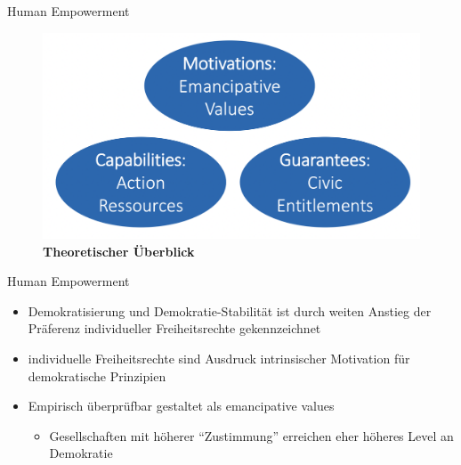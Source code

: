 \documentclass[11pt]{beamer}
\begin{document}
\begin{frame}{Human Empowerment \parencite{Welzel2013}}
	\begin{figure}[ht]
		\includegraphics[width=\textwidth]{pics/s9-1.png}
		\caption{\textbf{Theoretischer Überblick}}
	\end{figure}
\end{frame}

\begin{frame}{Human Empowerment}
	\begin{itemize}
		\item Demokratisierung und Demokratie-Stabilität ist durch weiten Anstieg der Präferenz individueller Freiheitsrechte gekennzeichnet \parencite{Welzel2013}
		\item individuelle Freiheitsrechte sind Ausdruck intrinsischer Motivation für demokratische Prinzipien \parencite{Welzel2013}
		\item Empirisch überprüfbar gestaltet als emancipative values \parencite{Welzel2013}
		\begin{itemize}
			\item Gesellschaften mit höherer “Zustimmung” erreichen eher höheres Level an
	Demokratie \parencite[398]{Welzel2007}
		\end{itemize}
	\end{itemize}
\end{frame}
\end{document}
